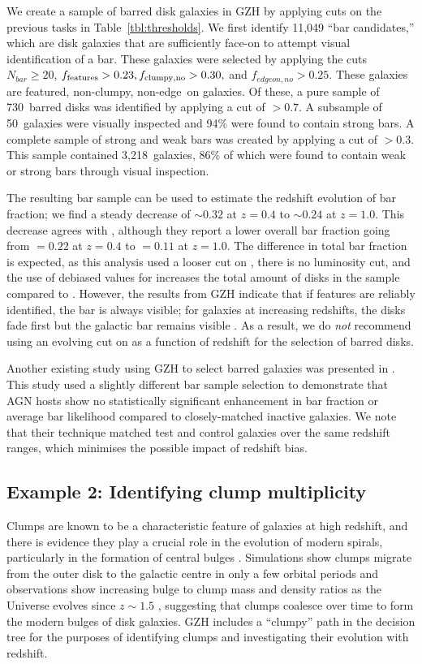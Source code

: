 \documentclass[a4paper,fleqn,usenatbib]{mnras}
\begin{document}
We create a sample of barred disk galaxies in GZH by applying cuts on the previous
tasks in Table~\ref{tbl:thresholds}. We first identify 11,049 ``bar
candidates,'' which are disk galaxies that are sufficiently face-on to attempt
visual identification of a bar. These galaxies were selected by applying the cuts $N_{bar} \ge 20$,
$f_{\rm features}>0.23, f_{\rm clumpy,no} > 0.30,$ and $f_{edgeon,no}>0.25$.
These galaxies are featured, non-clumpy, non-edge~on galaxies. Of these, a pure
sample of 730~barred disks was identified by applying a cut of \fbar$>0.7$. A
subsample of 50~galaxies were visually inspected and 94\% were found to contain
strong bars. A complete sample of strong and weak bars was created by applying
a cut of \fbar$>0.3$.  This sample contained 3,218~galaxies, 86\% of which were
found to contain weak or strong bars through visual inspection.

The resulting bar sample can be used to estimate the redshift evolution of bar
fraction; we find a steady decrease of \fbar$\sim 0.32$ at $z=0.4$ to
\fbar$\sim 0.24$ at $z=1.0$. This decrease agrees with
\citet{mel14}, although they report a lower overall bar fraction going from
\fbar$=0.22$ at $z=0.4$ to \fbar$=0.11$ at $z=1.0$. The difference in total bar
fraction is expected, as this analysis used a looser cut on \fbar, there is no
luminosity cut, and the use of debiased values for \ffeatures{} increases the
total amount of disks in the sample compared to \citet{mel14}. However, the
results from GZH indicate that if features are reliably identified, the bar is
always visible; for galaxies at increasing redshifts, the disks fade first but
the galactic bar remains visible \citep{mel16}. As a result, we do \emph{not}
recommend using an evolving cut on \fbar{} as a function of redshift for the
selection of barred disks. 

Another existing study using GZH to select barred galaxies was presented in
\citet{che15}. This study used a slightly different bar sample selection to
demonstrate that AGN hosts show no statistically significant enhancement in bar
fraction or average bar likelihood compared to closely-matched inactive
galaxies. We note that their technique matched test and control galaxies over
the same redshift ranges, which minimises the possible impact of redshift bias.

\subsection{Example 2: Identifying clump multiplicity} Clumps are known to be a
characteristic feature of galaxies at high redshift, and there is
evidence they play a crucial role in the evolution of modern spirals,
particularly in the formation of central bulges
\citep{elm05,elm14,guo15,beh16}. Simulations show clumps migrate from the outer
disk to the galactic centre in only a few orbital periods \citep{man15} and
observations show increasing bulge to clump mass and density ratios as the
Universe evolves since $z\sim 1.5$ \citep{elm09}, suggesting that clumps
coalesce over time to form the modern bulges of disk galaxies. GZH includes a
``clumpy'' path in the decision tree for the purposes of identifying clumps
and investigating their evolution with redshift. 
\end{document}
